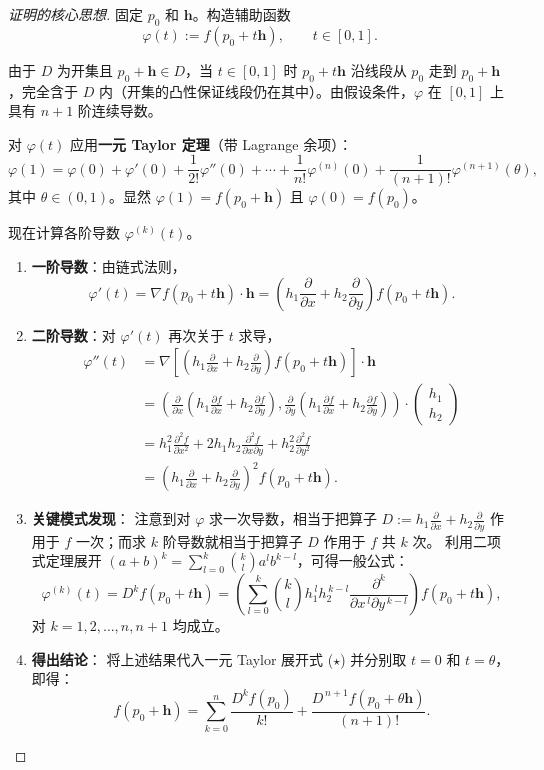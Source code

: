 \documentclass[lang=cn,11pt]{elegantbook}
\begin{document}
\begin{proof}[证明的核心思想] \label{proof:taylor}
固定 $p_0$ 和 $\boldsymbol h$。构造辅助函数
\[
\varphi(t):=f(p_0+t\boldsymbol h),\qquad t\in[0,1].
\]

由于 $D$ 为开集且 $p_0+\boldsymbol h\in D$，当 $t\in[0,1]$ 时 $p_0+t\boldsymbol h$ 沿线段从 $p_0$ 走到 $p_0+\boldsymbol h$，完全含于 $D$ 内（开集的凸性保证线段仍在其中）。由假设条件，$\varphi$ 在 $[0,1]$ 上具有 $n+1$ 阶连续导数。

对 $\varphi(t)$ 应用\textbf{一元 Taylor 定理}（带 Lagrange 余项）：
\[
\varphi(1)=\varphi(0)+\varphi'(0)+\frac{1}{2!}\varphi''(0)+\cdots +\frac{1}{n!}\varphi^{(n)}(0)+\frac{1}{(n+1)!}\varphi^{(n+1)}(\theta), \tag{$\star$}
\]
其中 $\theta\in(0,1)$。显然 $\varphi(1)=f(p_0+\boldsymbol h)$ 且 $\varphi(0)=f(p_0)$。

现在计算各阶导数 $\varphi^{(k)}(t)$。
\begin{enumerate}
  \item \textbf{一阶导数}：由链式法则，
  \[
  \varphi'(t)=\nabla f(p_0+t\boldsymbol h)\cdot\boldsymbol h
  =\left(h_1\frac{\partial}{\partial x}+h_2\frac{\partial}{\partial y}\right)f(p_0+t\boldsymbol h).
  \]
  \item \textbf{二阶导数}：对 $\varphi'(t)$ 再次关于 $t$ 求导，
  \begin{align*}
  \varphi''(t) &= \nabla \left[ \left(h_1\frac{\partial}{\partial x}+h_2\frac{\partial}{\partial y}\right) f(p_0+t\boldsymbol h) \right] \cdot \boldsymbol h \\[6pt]
  &= \left( \frac{\partial}{\partial x}\left(h_1\frac{\partial f}{\partial x}+h_2\frac{\partial f}{\partial y}\right), \frac{\partial}{\partial y}\left(h_1\frac{\partial f}{\partial x}+h_2\frac{\partial f}{\partial y}\right) \right) \cdot \begin{pmatrix} h_1 \\ h_2 \end{pmatrix} \\[6pt]
  &= h_1^2 \frac{\partial^2 f}{\partial x^2} + 2h_1h_2 \frac{\partial^2 f}{\partial x\partial y} + h_2^2 \frac{\partial^2 f}{\partial y^2} \\[6pt]
  &= \left(h_1\frac{\partial}{\partial x}+h_2\frac{\partial}{\partial y}\right)^{\!2}f(p_0+t\boldsymbol h).
  \end{align*}
  \item \textbf{关键模式发现}：
  注意到对 $\varphi$ 求一次导数，相当于把算子 $\displaystyle D:=h_1\frac{\partial}{\partial x}+h_2\frac{\partial}{\partial y}$ 作用于 $f$ 一次；而求 $k$ 阶导数就相当于把算子 $D$ 作用于 $f$ 共 $k$ 次。
  利用二项式定理展开 $(a+b)^k=\sum_{l=0}^{k}\binom{k}{l}a^lb^{k-l}$，可得一般公式：
  \[
  \varphi^{(k)}(t) = D^kf(p_0+t\boldsymbol h) = \left(\sum_{l=0}^{k}\binom{k}{l}h_1^{\,l}h_2^{\,k-l} \frac{\partial^k}{\partial x^{\,l}\partial y^{\,k-l}} \right)f(p_0+t\boldsymbol h),
  \]
  对 $k=1,2,\dots,n,n+1$ 均成立。
  \item \textbf{得出结论}：
  将上述结果代入一元 Taylor 展开式 ($\star$) 并分别取 $t=0$ 和 $t=\theta$，即得：
  \[
  f(p_0+\boldsymbol h)=\sum_{k=0}^{n}\frac{D^kf(p_0)}{k!}+ \frac{D^{\,n+1}f(p_0+\theta\boldsymbol h)}{(n+1)!}. 
  \]
\end{enumerate}
\end{proof}
\end{document}
